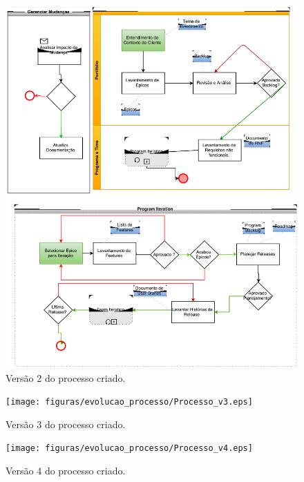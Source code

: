 \begin{apendicesenv}
\begin{figure}[H]
    \centering
	\includegraphics[keepaspectratio=true,scale=0.5]{figuras/evolucao_processo/Processo_v2.eps}
    \caption{Versão 2 do processo criado.}
    \label{fig:processo}
\end{figure}


\begin{figure}[H]
    \centering
	\texttt{[image: figuras/evolucao\_processo/Processo\_v3.eps]}
    \caption{Versão 3 do processo criado.}
    \label{fig:processo}
\end{figure}

\begin{figure}[H]
    \centering
	\texttt{[image: figuras/evolucao\_processo/Processo\_v4.eps]}
    \caption{Versão 4 do processo criado.}
    \label{fig:processo}
\end{figure}


\end{apendicesenv}
